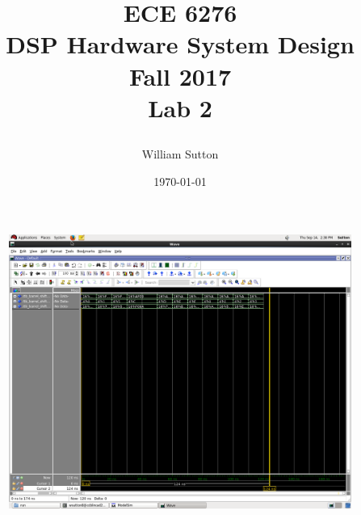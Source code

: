 \documentclass[11pt]{report}
\title{
		\Huge{
				\textbf{ECE 6276
						\\DSP Hardware System Design
						\\Fall 2017}}
			\\[2cm]
		\LARGE{
			\textnormal{Lab 2}}
			\\[1cm]
			\date{\today}
		\large{
			\author{William Sutton}
		}}
\begin{document}
\lstset{language=MATLAB}
\maketitle
%
\newpage

		\begin{figure}[!ht]
 		 \caption{}
  		 \centering
    	 \includegraphics[width=1.2\textwidth]{Screenshot.png}
		\end{figure}
		\newpage
		
\end{document}
